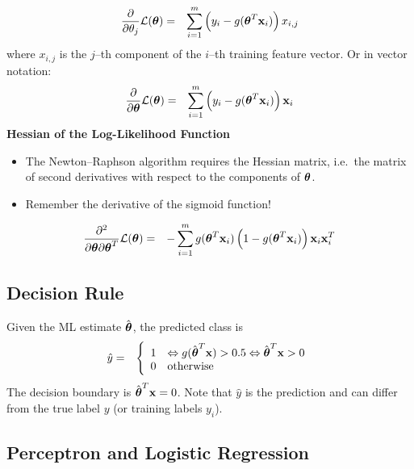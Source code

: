  {\small
  \begin{eqnarray*}
    \frac{\partial}{\partial \theta_j} \mathcal{L}(\bm{\mathrm{\theta}}) 
    &=& \sum _{i=1}^m  \left( y_i - g(\bm{\mathrm{\theta}}^T\bm{\mathrm{x}}_i) \right) x_{i,j}
  \end{eqnarray*}
  }
  where $x_{i,j}$ is the $j$--th component of the $i$--th training feature vector. 
  Or in vector notation:
  {\small
  \begin{eqnarray*}
    \frac{\partial}{\partial\bm{\mathrm{\theta}}} \mathcal{L}(\bm{\mathrm{\theta}}) 
    &=& \sum _{i=1}^m  \left( y_i-g(\bm{\mathrm{\theta}}^T\bm{\mathrm{x}}_i) \right)\bm{\mathrm{x}}_{i}
  \end{eqnarray*}
  }
  \textbf{Hessian of the Log-Likelihood Function}
  \begin{itemize}
    \item The Newton--Raphson algorithm requires the Hessian matrix, i.e.\ the matrix of second derivatives with respect to the components of $\bm{\mathrm{\theta}}$.
    \item Remember the derivative of the sigmoid function!
  \end{itemize}
  \begin{eqnarray*}
    \frac{\partial^2}{\partial\bm{\mathrm{\theta}} \partial \bm{\mathrm{\theta}}^T} \mathcal{L}(\bm{\mathrm{\theta}}) &=& -
    \sum _{i=1}^m  g(\bm{\mathrm{\theta}}^T\bm{\mathrm{x}}_i) \left(1-g(\bm{\mathrm{\theta}}^T\bm{\mathrm{x}}_i)\right)\bm{\mathrm{x}}_i \bm{\mathrm{x}}_i^T
  \end{eqnarray*} 

  \subsection{Decision Rule}
  Given the ML estimate $\hat{\bm{\mathrm{\theta}}}$, the predicted class is
  \begin{eqnarray*}
    \hat y &=& \left\{\begin{array}{ll}
      1 & \Leftrightarrow g(\hat{\bm{\mathrm{\theta}}}^T\bm{\mathrm{x}}) > 0.5 \Leftrightarrow \hat{\bm{\mathrm{\theta}}}^T\bm{\mathrm{x}} > 0 \\
      0 & \text{otherwise}
    \end{array}\right.
  \end{eqnarray*}
  The decision boundary is $\hat{\bm{\mathrm{\theta}}}^T\bm{\mathrm{x}} = 0$. Note that $\hat y$ is the prediction and can differ from the true label $y$ (or training labels $y_i$).

  \subsection{Perceptron and Logistic Regression}
  
